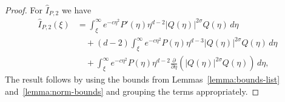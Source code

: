 \documentclass[11pt]{article}
\begin{document}
\begin{proof}
  For \(\hat{I}_{P,2}\) we have
  \begin{align*}
    \hat{I}_{P,2}(\xi)
    &= \int_{\xi}^{\infty}e^{-c\eta^{2}}
      P'(\eta)\eta^{d - 2}|Q(\eta)|^{2\sigma}Q(\eta)
      \,d\eta\\
    &\quad + (d - 2)\int_{\xi}^{\infty}e^{-c\eta^{2}}
      P(\eta)\eta^{d - 3}|Q(\eta)|^{2\sigma}Q(\eta)
      \,d\eta\\
    &\quad + \int_{\xi}^{\infty}e^{-c\eta^{2}}
      P(\eta)\eta^{d - 2}\frac{\partial}{\partial \eta}\left(|Q(\eta)|^{2\sigma}Q(\eta)\right)
      \,d\eta,
  \end{align*}
  The result follows by using the bounds from
  Lemmas~\ref{lemma:bounds-list} and~\ref{lemma:norm-bounds} and
  grouping the terms appropriately.


\end{proof}
\end{document}
